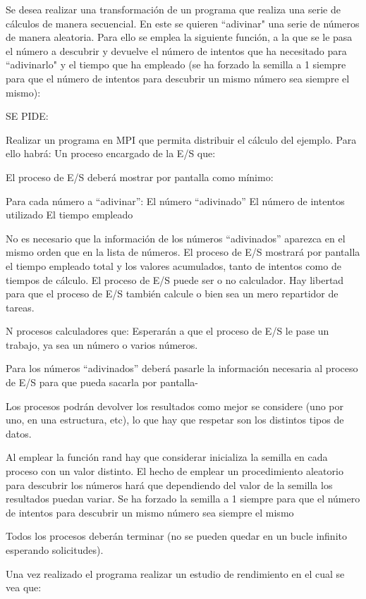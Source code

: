 \documentclass{article}
\begin{document}
Se desea realizar una transformación de un programa que realiza una serie de cálculos de manera secuencial. En este se quieren ``adivinar" una serie de números de manera aleatoria. Para ello se emplea la siguiente función, a la que se le pasa el número a descubrir y devuelve el número de intentos que ha necesitado para ``adivinarlo" y el tiempo que ha empleado (se ha forzado la semilla a 1 siempre para que el número de intentos para descubrir un mismo número sea siempre el mismo):

SE PIDE: 

Realizar un programa en MPI que permita distribuir el cálculo del ejemplo. Para ello habrá: 
	Un proceso encargado de la E/S que: 

		El proceso de E/S deberá mostrar por pantalla como mínimo: 

			Para cada número a ``adivinar'':
				El número ``adivinado''
				El número de intentos utilizado
				El tiempo empleado

			No es necesario que la información de los números “adivinados” aparezca en el mismo orden que en la lista de números.
		El proceso de E/S mostrará por pantalla el tiempo empleado total y los valores acumulados, tanto de intentos como de tiempos de cálculo. 
		El proceso de E/S puede ser o no calculador. Hay libertad para que el proceso de E/S también calcule o bien sea un mero repartidor de tareas. 

	N procesos calculadores que: 
		Esperarán a que el proceso de E/S le pase un trabajo, ya sea un número o varios números. 

		Para los números “adivinados” deberá pasarle la información necesaria al proceso de E/S para que pueda sacarla por pantalla- 

		Los procesos podrán devolver los resultados como mejor se considere (uno por uno, en una estructura, etc), lo que hay que respetar son los distintos tipos de datos. 

		Al emplear la función rand hay que considerar inicializa la semilla en cada proceso con un valor distinto. El hecho de emplear un procedimiento aleatorio para descubrir los números hará que dependiendo del valor de la semilla los resultados puedan variar. Se ha forzado la semilla a 1 siempre para que el número de intentos para descubrir un mismo número sea siempre el mismo 

	Todos los procesos deberán terminar (no se pueden quedar en un bucle infinito esperando solicitudes). 

Una vez realizado el programa realizar un estudio de rendimiento en el cual se vea que:
\end{document}
